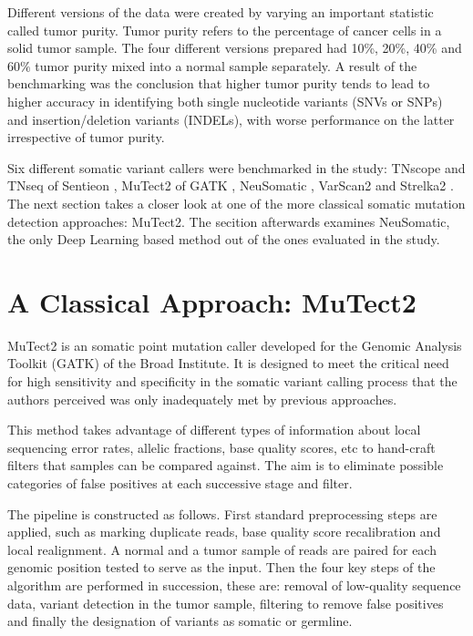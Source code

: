 \documentclass[bsc,frontabs,singlespacing,parskip,deptreport]{infthesis}
\begin{document}
Different versions of the data were created by varying an important statistic called tumor purity. Tumor purity refers to the percentage of cancer cells in a solid tumor sample. The four different versions prepared had 10\%, 20\%, 40\% and 60$ \% $ tumor purity mixed into a normal sample separately. A result of the benchmarking was the conclusion that higher tumor purity tends to lead to higher accuracy in identifying both single nucleotide variants (SNVs or SNPs) and insertion/deletion variants (INDELs), with worse performance on the latter irrespective of tumor purity.

Six different somatic variant callers were benchmarked in the study: TNscope \cite{tnscope} and TNseq of Sentieon \cite{sentieon}, MuTect2 \cite{mutec} of GATK \cite{gatk}, NeuSomatic \cite{neusomatic}, VarScan2 \cite{varscan2} and Strelka2 \cite{strelka2}. The next section takes a closer look at one of the more classical somatic mutation detection approaches: MuTect2. The secition afterwards examines NeuSomatic, the only Deep Learning based method out of the ones evaluated in the study.

\section{A Classical Approach: MuTect2}

MuTect2 \cite{mutec} is an somatic point mutation caller developed for the Genomic Analysis Toolkit (GATK) \cite{gatk} of the Broad Institute. It is designed to meet the critical need for high sensitivity and specificity in the somatic variant calling process that the authors perceived was only inadequately met by previous approaches.

This method takes advantage of different types of information about local sequencing error rates, allelic fractions, base quality scores, etc to hand-craft filters that samples can be compared against. The aim is to  eliminate possible categories of false positives at each successive stage and filter.

The pipeline is constructed as follows. First standard preprocessing steps are applied, such as marking duplicate reads, base quality score recalibration and local realignment. A normal and a tumor sample of reads are paired for each genomic position tested to serve as the input. Then the four key steps of the algorithm are performed in succession, these are: removal of low-quality sequence data, variant detection in the tumor sample, filtering to remove false positives and finally the designation of variants as somatic or germline.
\end{document}
